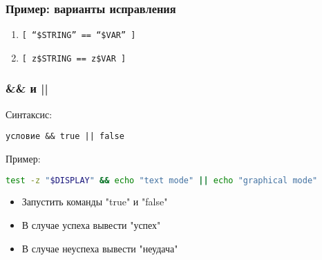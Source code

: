 \begin{frame}
	\frametitle{Пример: варианты исправления}

		\begin{enumerate}
			\item {\tt [ ``\$STRING'' == ``\$VAR'' ] }
			\item {\tt [ z\$STRING == z\$VAR ] }
		\end{enumerate}

\end{frame}

\begin{frame}[fragile]
\frametitle{\&\& и ||}
	Синтаксис:
\begin{verbatim}
условие && true || false
\end{verbatim}

	\pause
	Пример:
\begin{lstlisting}[language=bash]
test -z "$DISPLAY" && echo "text mode" || echo "graphical mode"
\end{lstlisting}
	
	\pause

	\begin{itemize}
	    \item Запустить команды "true" и "false"
	    \item В случае успеха вывести "успех"
	    \item В случае неуспеха вывести "неудача"
	\end{itemize}
\end{frame}




